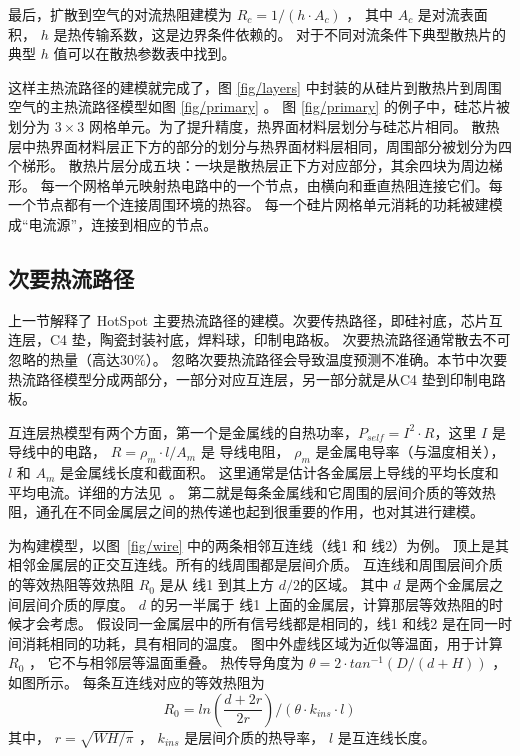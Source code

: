 最后，扩散到空气的对流热阻建模为 $R_c = 1/(h\cdot A_c)$ ， 其中 $A_c$ 是对流表面积， $h$ 是热传输系数，这是边界条件依赖的。
对于不同对流条件下典型散热片的典型 $h$ 值可以在散热参数表中找到。

这样主热流路径的建模就完成了，图 \ref{fig/layers} 中封装的从硅片到散热片到周围空气的主热流路径模型如图 \ref{fig/primary} 。 
图 \ref{fig/primary} 的例子中，硅芯片被划分为 $3 \times 3$ 网格单元。为了提升精度，热界面材料层划分与硅芯片相同。
散热层中热界面材料层正下方的部分的划分与热界面材料层相同，周围部分被划分为四个梯形。
散热片层分成五块：一块是散热层正下方对应部分，其余四块为周边梯形。
每一个网格单元映射热电路中的一个节点，由横向和垂直热阻连接它们。每一个节点都有一个连接周围环境的热容。
每一个硅片网格单元消耗的功耗被建模成“电流源”，连接到相应的节点。

\subsection{次要热流路径}\label{sec:secondary}

上一节解释了 HotSpot 主要热流路径的建模。次要传热路径，即硅衬底，芯片互连层，C4 垫，陶瓷封装衬底，焊料球，印制电路板。
次要热流路径通常散去不可忽略的热量（高达$30\%$）。
忽略次要热流路径会导致温度预测不准确。本节中次要热流路径模型分成两部分，一部分对应互连层，另一部分就是从C4 垫到印制电路板。

互连层热模型有两个方面，第一个是金属线的自热功率，$P_{self} = I^2\cdot R$，这里 $I$ 是导线中的电路，
$R = \rho_m \cdot l/A_m$ 是 导线电阻， $\rho_m$ 是金属电导率（与温度相关）， $l$ 和 $A_m$ 是金属线长度和截面积。
这里通常是估计各金属层上导线的平均长度和平均电流。详细的方法见~\cite{huang2004compact}。
第二就是每条金属线和它周围的层间介质的等效热阻，通孔在不同金属层之间的热传递也起到很重要的作用，也对其进行建模。


为构建模型，以图~\ref{fig/wire} 中的两条相邻互连线（线1 和 线2）为例。
顶上是其相邻金属层的正交互连线。所有的线周围都是层间介质。
互连线和周围层间介质的等效热阻等效热阻 $R_0$ 是从 线1 到其上方 $d/2$的区域。
其中 $d$ 是两个金属层之间层间介质的厚度。
$d$ 的另一半属于 线1 上面的金属层，计算那层等效热阻的时候才会考虑。
假设同一金属层中的所有信号线都是相同的，线1 和线2 是在同一时间消耗相同的功耗，具有相同的温度。
图中外虚线区域为近似等温面，用于计算 $R_0$ ， 它不与相邻层等温面重叠。
热传导角度为 $\theta = 2 \cdot tan^{-1}(D/(d+H))$ ，如图所示。
每条互连线对应的等效热阻为
\begin{equation}\label{eq:R0}
R_0 = ln(\frac{d+2r}{2r})/(\theta \cdot k_{ins} \cdot l)
\end{equation}
其中， $r = \sqrt{WH/\pi}$ ， $k_{ins}$ 是层间介质的热导率， $l$ 是互连线长度。

